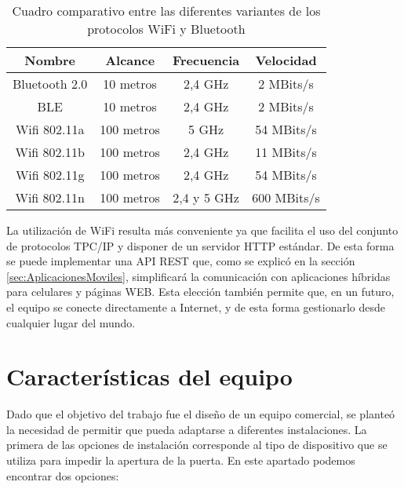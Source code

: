 \begin{table}[ht]
	\centering
	\caption[Comparación entre los protocolos Bluetooth y WiFi]{Cuadro comparativo entre las diferentes variantes de los protocolos WiFi y Bluetooth}
	\begin{tabular}{c c c c}
		\toprule
		\textbf{Nombre}	
		& \textbf{Alcance}
		& \textbf{Frecuencia}
		& \textbf{Velocidad}
		\\
		\midrule
		Bluetooth 2.0
		& 10 metros
		& 2,4 GHz
		& 2 MBits/s
		\\
		BLE
		& 10 metros
		& 2,4 GHz
		& 2 MBits/s
		\\
		Wifi 802.11a
		& 100 metros
		& 5 GHz
		& 54 MBits/s
		\\
		Wifi 802.11b
		& 100 metros
		& 2,4 GHz
		& 11 MBits/s
		\\
		Wifi 802.11g
		& 100 metros
		& 2,4 GHz
		& 54 MBits/s
		\\
		Wifi 802.11n
		& 100 metros
		& 2,4 y 5 GHz
		& 600 MBits/s
		\\
		\bottomrule
		\hline
	\end{tabular}
	\label{tab:WifiBluetooth}
\end{table}

La utilización de WiFi resulta más conveniente ya que facilita el uso del conjunto de protocolos TPC/IP y disponer de un servidor HTTP estándar. De esta forma se puede implementar una API REST que, como se explicó en la sección \ref{sec:AplicacionesMoviles}, simplificará la comunicación con aplicaciones híbridas para celulares y páginas WEB. Esta elección también permite que, en un futuro, el equipo se conecte directamente a Internet, y de esta forma gestionarlo desde cualquier lugar del mundo.

\section{Características del equipo}
\label{sec:Caracteristicas}

Dado que el objetivo del trabajo fue el diseño de un equipo comercial, se planteó la necesidad de permitir que pueda adaptarse a diferentes instalaciones. La primera de las opciones de instalación corresponde al tipo de dispositivo que se utiliza para impedir la apertura de la puerta. En este apartado podemos encontrar dos opciones:

